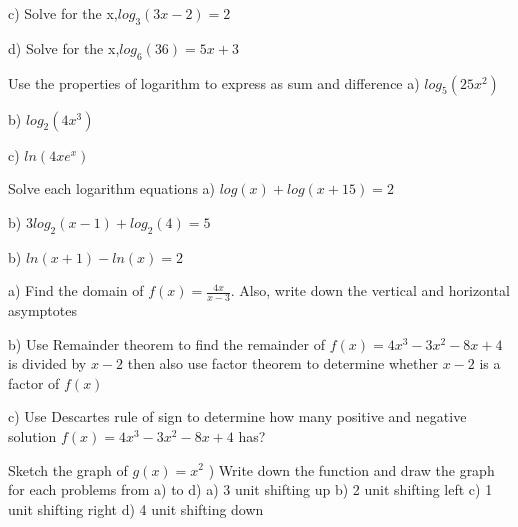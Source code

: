 \documentclass{exam}
\begin{document}
\begin{questions}
	\subitem c) Solve for the x,\quad \( log_3(3x-2)=2\) \hfill\enspace\hrulefill 
	\vspace{6cm}
	
	\subitem d) Solve for the x,\quad \( log_6(36)=5x+3\) \hfill\enspace\hrulefill 
	\vspace{6cm}
	
	
	
	
	\clearpage
	\question Use the properties of logarithm to express as sum and difference 
	\subitem a) \(log_5(25x^2)\) \hfill\enspace\hrulefill 
	
	\subitem b) \(log_{2}(4x^3)\) \hfill\enspace\hrulefill 
	
	\subitem c) \(ln(4xe^x)\) \hfill\enspace\hrulefill 

	\clearpage
\question 	Solve each logarithm equations
	\subitem a) \(log(x)+log(x+15)=2\) \hfill\enspace\hrulefill 
	
	\subitem b) \(3log_2(x-1)+log_2(4)=5\) \hfill\enspace\hrulefill 
	
	\subitem b) \(ln(x+1)-ln(x)=2\) \hfill\enspace\hrulefill 
	
	\clearpage
	\question 
	\subitem a) Find the domain of  \(f(x)=\frac{4x}{x-3}\). Also, write down the vertical and horizontal asymptotes
	 \hfill\enspace\hrulefill 
	
	\subitem b) Use Remainder theorem to find the remainder of  \(f(x)=4x^3-3x^2-8x+4\) is divided by \( x-2\) then also use factor theorem to determine whether \(x-2\) is a factor of \(f(x)\) \hfill\enspace\hrulefill 
	
	\subitem c) Use Descartes rule of sign to determine how many positive and negative solution \(f(x)=4x^3-3x^2-8x+4\) has?  \hfill\enspace\hrulefill 
	
	\clearpage
	\question Sketch the graph of \(g(x)=x^2\) 
	) Write down the function and draw the graph for each problems from a) to d) 
	\subitem a) 3 unit shifting up
	\subitem b) 2 unit shifting left
	\subitem c) 1 unit shifting right
	\subitem d) 4 unit shifting down
	

\end{questions}
\end{document}
